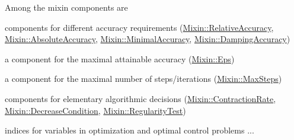 Among the mixin components are
\begin{DoxyItemize}
\item components for different accuracy requirements (\hyperlink{classSpacy_1_1Mixin_1_1RelativeAccuracy}{Mixin\+::\+Relative\+Accuracy}, \hyperlink{classSpacy_1_1Mixin_1_1AbsoluteAccuracy}{Mixin\+::\+Absolute\+Accuracy}, \hyperlink{classSpacy_1_1Mixin_1_1MinimalAccuracy}{Mixin\+::\+Minimal\+Accuracy}, \hyperlink{classSpacy_1_1Mixin_1_1DampingAccuracy}{Mixin\+::\+Damping\+Accuracy})
\item a component for the maximal attainable accuracy (\hyperlink{classSpacy_1_1Mixin_1_1Eps}{Mixin\+::\+Eps})
\item a component for the maximal number of steps/iterations (\hyperlink{classSpacy_1_1Mixin_1_1MaxSteps}{Mixin\+::\+Max\+Steps})
\item components for elementary algorithmic decisions (\hyperlink{classSpacy_1_1Mixin_1_1ContractionRate}{Mixin\+::\+Contraction\+Rate}, \hyperlink{classSpacy_1_1Mixin_1_1DecreaseCondition}{Mixin\+::\+Decrease\+Condition}, \hyperlink{classSpacy_1_1Mixin_1_1RegularityTest}{Mixin\+::\+Regularity\+Test})
\item indices for variables in optimization and optimal control problems ... 
\end{DoxyItemize}
